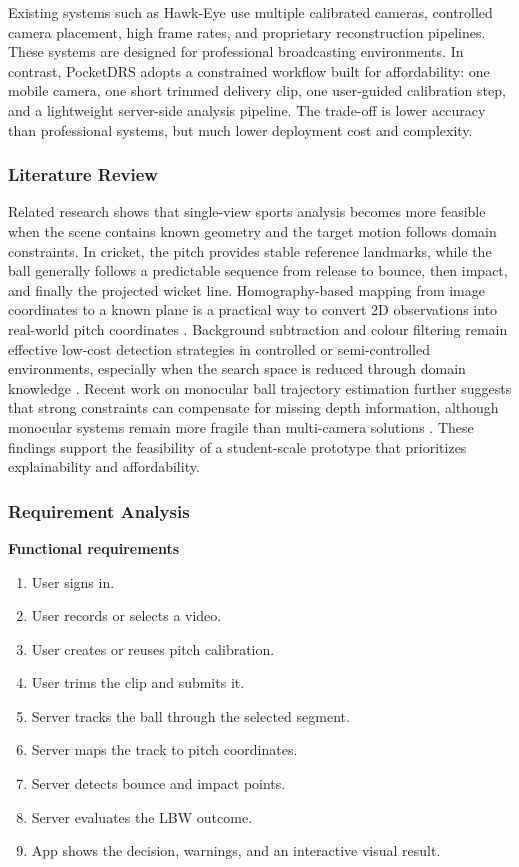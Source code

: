\documentclass[12pt,a4paper]{article}
\begin{document}
Existing systems such as Hawk-Eye use multiple calibrated cameras, controlled camera placement, high frame rates, and proprietary reconstruction pipelines. These systems are designed for professional broadcasting environments. In contrast, PocketDRS adopts a constrained workflow built for affordability: one mobile camera, one short trimmed delivery clip, one user-guided calibration step, and a lightweight server-side analysis pipeline. The trade-off is lower accuracy than professional systems, but much lower deployment cost and complexity.

\subsubsection{Literature Review}

Related research shows that single-view sports analysis becomes more feasible when the scene contains known geometry and the target motion follows domain constraints. In cricket, the pitch provides stable reference landmarks, while the ball generally follows a predictable sequence from release to bounce, then impact, and finally the projected wicket line. Homography-based mapping from image coordinates to a known plane is a practical way to convert 2D observations into real-world pitch coordinates \cite{zhang2000}. Background subtraction and colour filtering remain effective low-cost detection strategies in controlled or semi-controlled environments, especially when the search space is reduced through domain knowledge \cite{opencv2024}. Recent work on monocular ball trajectory estimation further suggests that strong constraints can compensate for missing depth information, although monocular systems remain more fragile than multi-camera solutions \cite{ponglertnapakorn2021}. These findings support the feasibility of a student-scale prototype that prioritizes explainability and affordability.

\subsubsection{Requirement Analysis}

\textbf{Functional requirements}

\begin{enumerate}
    \item User signs in.
    \item User records or selects a video.
    \item User creates or reuses pitch calibration.
    \item User trims the clip and submits it.
    \item Server tracks the ball through the selected segment.
    \item Server maps the track to pitch coordinates.
    \item Server detects bounce and impact points.
    \item Server evaluates the LBW outcome.
    \item App shows the decision, warnings, and an interactive visual result.
\end{enumerate}
\end{document}
